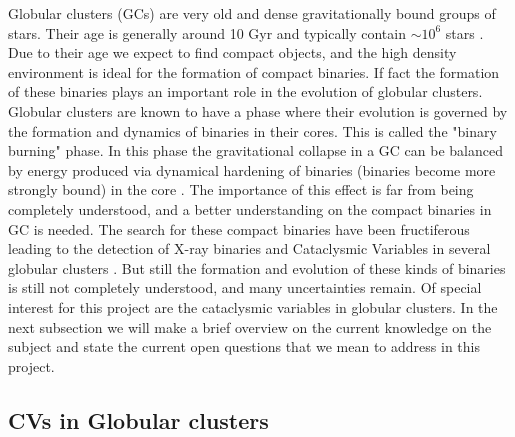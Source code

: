 Globular clusters (GCs) are very old and dense gravitationally bound groups of stars. Their age is generally around 10 Gyr \citep{meylan_internal_1997} and typically contain $\sim 10^6$ stars \citep{knigge_cataclysmic_2012}. Due to their age we expect to find compact objects, and the high density environment is ideal for the formation of compact binaries. If fact the formation of these binaries plays an important role in the evolution of globular clusters. Globular clusters are known to have a phase where their evolution is governed by the formation and dynamics of binaries in their cores. This is called the "binary burning" phase. In this phase the gravitational collapse in a GC can be balanced by energy produced via dynamical hardening of binaries (binaries become more strongly bound) in the core \citep[e.g.][]{hut_binaries_1992}. The importance of this effect is far from being completely understood, and a better understanding on the compact binaries in GC is needed. The search for these compact binaries have been fructiferous leading to the detection of X-ray binaries and Cataclysmic Variables in several globular clusters \citep[e.g.][]{maccarone_compact_2007}. But still the formation and evolution of these kinds of binaries is still not completely understood, and many uncertainties remain. Of special interest for this project are the cataclysmic variables in globular clusters. In the next subsection we will make a brief overview on the current knowledge on the subject and state the current open questions that we mean to address in this project. 


%

\subsection{CVs in Globular clusters}\label{sec:cogc}


